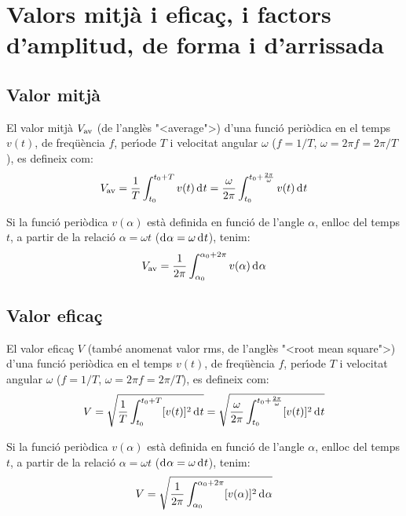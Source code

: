 \section{Valors mitj\`{a} i efica\c{c}, i factors d'amplitud, de forma i
d'arrissada}\label{sec:val_mitja_ef}

\subsection{Valor mitj\`{a}}

El valor mitj\`{a} $V_\mathrm{av}$ (de l'angl\`{e}s {"<}average{">}) d'una funci\'{o}
peri\`{o}dica en el temps $v(t)$, de freq\"{u}\`{e}ncia $f$, per\'{\i}ode $T$ i
velocitat angular $\omega$ ($f = 1/T$, $\omega=2\pi f = 2\pi/T$), es
defineix com:
\begin{equation}
    V\ped{av} = \frac{1}{T} \int_{t_0}^{t_0+T} v(t) \diff t =
    \frac{\omega}{2\pi} \int_{t_0}^{t_0+\frac{2\pi}{\omega}} v(t) \diff t\label{eq:vm_t}
\end{equation}

Si la funci\'{o} peri\`{o}dica $v(\alpha)$ est\`{a} definida en funci\'{o} de
l'angle $\alpha$, enlloc del temps $t$, a partir de la relaci\'{o}
$\alpha=\omega t$ ($\diff\alpha=\omega\diff t$), tenim:
\begin{equation}
    V\ped{av} = \frac{1}{2\pi} \int_{\alpha_0}^{\alpha_0+2\pi} v(\alpha) \diff \alpha
    \label{eq:vm_alfa}
\end{equation}

\subsection{Valor efica\c{c}}

El valor efica\c{c}  $V$ (tamb\'{e} anomenat valor rms, de l'angl\`{e}s {"<}root
mean square{">}) d'una funci\'{o} peri\`{o}dica en el temps $v(t)$, de
freq\"{u}\`{e}ncia $f$, per\'{\i}ode $T$ i velocitat angular $\omega$ ($f = 1/T$,
$\omega=2\pi f = 2\pi/T$), es defineix com:
\begin{equation}
    V = \sqrt{\frac{1}{T} \int_{t_0}^{t_0+T} [v(t)]^2 \diff
    t} = \sqrt{\frac{\omega}{2\pi} \int_{t_0}^{t_0+\frac{2\pi}{\omega}}
     [v(t)]^2 \diff t}
\end{equation}

Si la funci\'{o} peri\`{o}dica $v(\alpha)$ est\`{a} definida en funci\'{o} de
l'angle $\alpha$, enlloc del temps $t$, a partir de la relaci\'{o}
$\alpha=\omega t$ ($\diff\alpha=\omega\diff t$), tenim:
\begin{equation}
    V = \sqrt{\frac{1}{2\pi} \int_{\alpha_0}^{\alpha_0+2\pi}
     [v(\alpha)]^2 \diff \alpha}
\end{equation}

